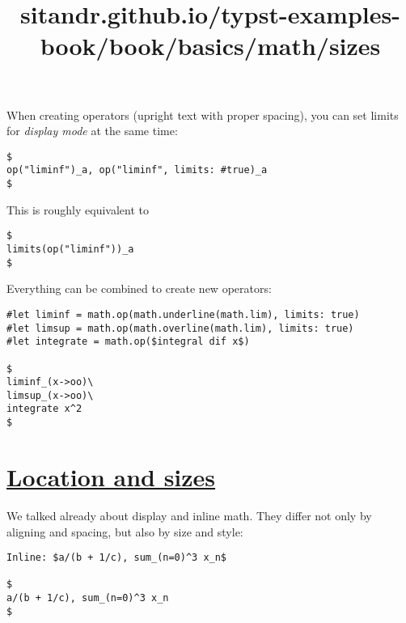 When creating operators (upright text with proper spacing), you can set
limits for \emph{display mode} at the same time:

\begin{verbatim}
$
op("liminf")_a, op("liminf", limits: #true)_a
$
\end{verbatim}

\pandocbounded{}

This is roughly equivalent to

\begin{verbatim}
$
limits(op("liminf"))_a
$
\end{verbatim}

\pandocbounded{}

Everything can be combined to create new operators:

\begin{verbatim}
#let liminf = math.op(math.underline(math.lim), limits: true)
#let limsup = math.op(math.overline(math.lim), limits: true)
#let integrate = math.op($integral dif x$)

$
liminf_(x->oo)\
limsup_(x->oo)\
integrate x^2
$
\end{verbatim}

\pandocbounded{}


\title{sitandr.github.io/typst-examples-book/book/basics/math/sizes}

\section{\texorpdfstring{\hyperref[location-and-sizes]{Location and
sizes}}{Location and sizes}}\label{location-and-sizes}

We talked already about display and inline math. They differ not only by
aligning and spacing, but also by size and style:

\begin{verbatim}
Inline: $a/(b + 1/c), sum_(n=0)^3 x_n$

$
a/(b + 1/c), sum_(n=0)^3 x_n
$
\end{verbatim}

\pandocbounded{}

